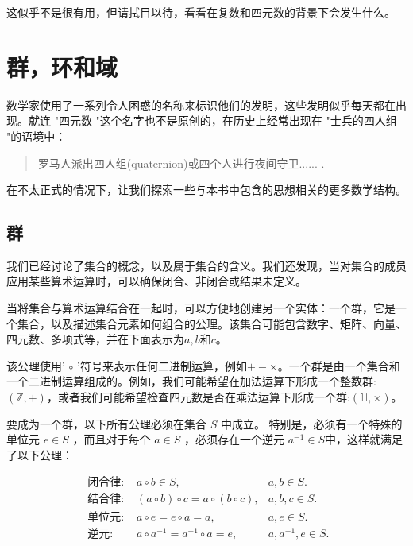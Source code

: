 这似乎不是很有用，但请拭目以待，看看在复数和四元数的背景下会发生什么。

\section{群，环和域}
数学家使用了一系列令人困惑的名称来标识他们的发明，这些发明似乎每天都在出现。就连 "四元数 "这个名字也不是原创的，在历史上经常出现在 "士兵的四人组 "的语境中：

\begin{CJK}{UTF8}{gkai}
    \begin{quotation}
        罗马人派出四人组(quaternion)或四个人进行夜间守卫...... \cite{bib2-1}.
    \end{quotation}
\end{CJK}

在不太正式的情况下，让我们探索一些与本书中包含的思想相关的更多数学结构。

\subsection{群}
我们已经讨论了集合的概念，以及属于集合的含义。我们还发现，当对集合的成员应用某些算术运算时，可以确保闭合、非闭合或结果未定义。

当将集合与算术运算结合在一起时，可以方便地创建另一个实体：一个群，它是一个集合，以及描述集合元素如何组合的公理。该集合可能包含数字、矩阵、向量、四元数、多项式等，并在下面表示为$a, b$和$c$。

该公理使用' $\circ$ '符号来表示任何二进制运算，例如$+- \times$。一个群是由一个集合和一个二进制运算组成的。例如，我们可能希望在加法运算下形成一个整数群:$(\mathbb{Z},+)$，或者我们可能希望检查四元数是否在乘法运算下形成一个群:$(\mathbb{H}, \times)$。

要成为一个群，以下所有公理必须在集合 $S$ 中成立。 特别是，必须有一个特殊的单位元 $e \in S$ ，而且对于每个 $a \in S$ ，必须存在一个逆元 $a^{-1} \in S$中，这样就满足了以下公理：

$$
    \begin{array}{rlr}
        \text { 闭合律: }       & a \circ b \in S,                        & a, b \in S .         \\
        \text { 结合律: } & (a \circ b) \circ c=a \circ(b \circ c), & a, b, c \in S .      \\
        \text { 单位元: }      & a \circ e=e \circ a=a,                  & a, e \in S .         \\
        \text { 逆元: }       & a \circ a^{-1}=a^{-1} \circ a=e,        & a, a^{-1}, e \in S .
    \end{array}
$$

